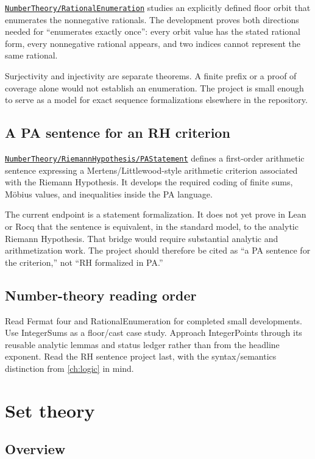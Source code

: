 \documentclass[
  10pt,
  a4paper,
  twoside,
  open=any,
  parskip=half,
  headings=big
]{scrreprt}
\newcommand{\CommitFull}{56a402bf82a9aab119fcbe3e96b991d387b221c5}
\newcommand{\RepoWeb}{https://github.com/VladimirReshetnikov/ProveIt}
\newcommand{\RepoTreeBase}{\RepoWeb/tree/\CommitFull}
\newcommand{\RepoDir}[1]{\href{\RepoTreeBase/#1}{\nolinkurl{#1}}}
\begin{document}
\RepoDir{NumberTheory/RationalEnumeration} studies an explicitly defined floor orbit that enumerates the nonnegative rationals. The development proves both directions needed for ``enumerates exactly once'': every orbit value has the stated rational form, every nonnegative rational appears, and two indices cannot represent the same rational.

Surjectivity and injectivity are separate theorems. A finite prefix or a proof of coverage alone would not establish an enumeration. The project is small enough to serve as a model for exact sequence formalizations elsewhere in the repository.

\section{A PA sentence for an RH criterion}
\label{sec:rh-pa}

\RepoDir{NumberTheory/RiemannHypothesis/PAStatement} defines a first-order arithmetic sentence expressing a Mertens/Littlewood-style arithmetic criterion associated with the Riemann Hypothesis. It develops the required coding of finite sums, M\"obius values, and inequalities inside the PA language.

The current endpoint is a statement formalization. It does not yet prove in Lean or Rocq that the sentence is equivalent, in the standard model, to the analytic Riemann Hypothesis. That bridge would require substantial analytic and arithmetization work. The project should therefore be cited as ``a PA sentence for the criterion,'' not ``RH formalized in PA.''

\section{Number-theory reading order}

Read Fermat four and RationalEnumeration for completed small developments. Use IntegerSums as a floor/cast case study. Approach IntegerPoints through its reusable analytic lemmas and status ledger rather than from the headline exponent. Read the RH sentence project last, with the syntax/semantics distinction from \cref{ch:logic} in mind.

\chapter{Set theory}
\label{ch:set-theory}

\section{Overview}
\end{document}
